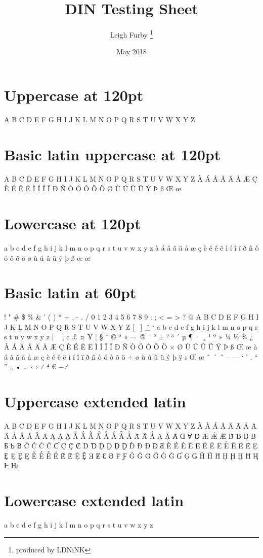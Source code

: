 \documentclass[12pt, a4paper]{article}
\title{DIN Testing Sheet}
\author{Leigh Furby \thanks{produced by LDNiNK}}
\date{May 2018}
\begin{document}
 
\begin{titlepage}
\maketitle
\end{titlepage}





\fontsize{120}{140}\selectfont				%


\section{Uppercase at 120pt}
A B C D E F G H I J K L M N O P Q R S T U V W X Y Z

\section{Basic latin uppercase at 120pt}
\fontsize{90}{120}\selectfont
A B C D E F G H I J K L M N O P Q R S T U V W X Y Z À Á Â Ã Ä Å Æ Ç È É Ê Ë Ì Í Î Ï Ð Ñ Ò Ó Ô Õ Ö Ø Ù Ú Û Ü Ý Þ ß Œ œ 

\section{Lowercase at 120pt}
a b c d e f g h i j k l m n o p q r s t u v w x y z à á â ã ä å æ ç è é ê ë ì í î ï ð ñ ò ó ô õ ö ø ù ú û ü ý þ ß œ œ 

\section{Basic latin at 60pt}
\fontsize{60}{120}\selectfont
! " \# \$ \% \& ' ( ) * + , - . / 0 1 2 3 4 5 6 7 8 9 : ; < = > ? @ A B C D E F G H I J K L M N O P Q R S T U V W X Y Z [ \ ] \^ \_ ` a b c d e f g h i j k l m n o p q r s t u v w x y z  { | } ~ ¡ ¢ £ ¤ ¥ ¦ § ¨ © ª « ¬ ­ ® ¯ ° ± ² ³ ´ µ ¶ · ¸ ¹ º » ¼ ½ ¾ ¿ À Á Â Ã Ä Å Æ Ç È É Ê Ë Ì Í Î Ï Ð Ñ Ò Ó Ô Õ Ö × Ø Ù Ú Û Ü Ý Þ ß Œ œ à á â ã ä å æ ç è é ê ë ì í î ï ð ñ ò ó ô õ ö ÷ ø ù ú û ü ý þ ÿ ı Œ œ ˆ ˚ ˜ – — ‘ ’ ‚ “ ” „ • … ‹ › ⁄ ⁴ € − ∕

\section{Uppercase extended latin}
\fontsize{60}{90}\selectfont	
A B C D E F G H I J K L M N O P Q R S T U V W X Y Z À À Á Â Ã Ā Ă Ȧ Ä Ả Å Ǎ Ȁ Ȃ Ą Ạ Ḁ Ầ Ấ Ẫ Ẩ Ằ Ắ Ẵ Ẳ Ǡ Ǟ Ǻ Ậ Ặ Ⱥ Ɑ Ɐ Ɒ Æ Ǽ Ǣ Ḃ Ɓ Ḅ Ḇ Ƃ Ƅ Ƀ Ć Ĉ Ċ Č Ƈ Ç Ḉ Ȼ Ḋ Ɗ Ḍ Ḏ Ḑ Ḓ Ď Ð Đ Ɖ Ƌ È É Ê Ẽ Ē Ĕ Ė Ë Ẻ Ě Ȅ Ȇ Ẹ Ȩ Ę Ḙ Ḛ Ề Ế Ễ Ể Ḕ Ḗ Ệ Ḝ Ǝ Ɇ Ɛ Ə Ḟ Ƒ Ǵ Ĝ Ḡ Ğ Ġ Ǧ Ɠ Ģ Ǥ Ĥ Ḧ Ȟ Ḥ Ḩ Ḫ Ħ Ⱨ Ⱶ Ƕ 

\section{Lowercase extended latin}
a b c d e f g h i j k l m n o p q r s t u v w x y z
\end{document}
